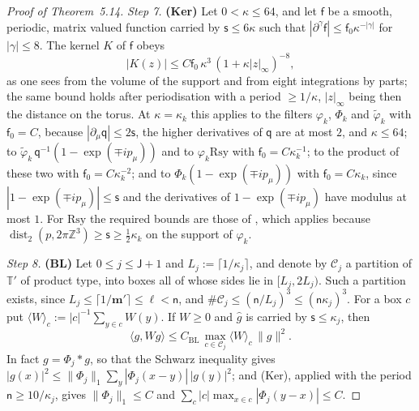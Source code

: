 \documentclass[11pt]{amsart}
\theoremstyle{definition}
\begin{document}
\begin{proof}[Proof of Theorem~5.14]
\emph{Step 7.}
\textbf{(Ker)} Let $0<\kappa\le64$, and let $\mathsf f$ be a smooth, periodic, matrix valued function carried by $\mathsf s\le6\kappa$ such that $|\partial^\gamma\mathsf f|\le\mathsf f_0\kappa^{-|\gamma|}$ for $|\gamma|\le8$.
The kernel $K$ of $\mathsf f$ obeys
\begin{equation*}
|K(z)|\le C\mathsf f_0\,\kappa^3\,(1+\kappa|z|_\infty)^{-8},
\end{equation*}
as one sees from the volume of the support and from eight integrations by parts;
the same bound holds after periodisation with a period $\ge1/\kappa$, $|z|_\infty$ being then the distance on the torus.
At $\kappa=\kappa_k$ this applies to the filters $\varphi_k$, $\Phi_k$ and $\tilde\varphi_k$ with $\mathsf f_0=C$, because $|\partial_\mu\mathsf q|\le2\mathsf s$, the higher derivatives of $\mathsf q$ are at most $2$, and $\kappa\le64$;
to $\tilde\varphi_k\,\mathsf q^{-1}(1-\exp(\mp ip_\mu))$ and to $\varphi_k\mathrm{Rsy}$ with $\mathsf f_0=C\kappa_k^{-1}$;
to the product of these two with $\mathsf f_0=C\kappa_k^{-2}$;
and to $\Phi_k(1-\exp(\mp ip_\mu))$ with $\mathsf f_0=C\kappa_k$, since $|1-\exp(\mp ip_\mu)|\le\mathsf s$ and the derivatives of $1-\exp(\mp ip_\mu)$ have modulus at most $1$.
For $\mathrm{Rsy}$ the required bounds are those of \cite[Proposition~37.1\,(g)]{QEDIII}, which applies because $\operatorname{dist}_2(p,\allowbreak 2\pi\mathbb Z^3)\ge\mathsf s\ge\frac12\kappa_k$ on the support of $\varphi_k$.

\emph{Step 8.}
\textbf{(BL)} Let $0\le j\le\mathsf J+1$ and $L_j:=\lceil1/\kappa_j\rceil$, and denote by $\mathcal C_j$ a partition of $\mathbb T'$ of product type, into boxes all of whose sides lie in $[L_j,2L_j)$.
Such a partition exists, since $L_j\le\lceil1/\mathbf m'\rceil\le\ell<\mathsf n$, and $\#\mathcal C_j\le(\mathsf n/L_j)^3\le(\mathsf n\kappa_j)^3$.
For a box $c$ put $\langle W\rangle_c:=|c|^{-1}\sum_{y\in c}W(y)$.
If $W\ge0$ and $\hat g$ is carried by $\mathsf s\le\kappa_j$, then
\begin{equation*}
\langle g,Wg\rangle\le C_{\mathrm{BL}}\,\max_{c\in\mathcal C_j}\langle W\rangle_c\,\|g\|^2.
\end{equation*}
In fact $g=\Phi_j*g$, so that the Schwarz inequality gives $|g(x)|^2\le\|\Phi_j\|_1\sum_y|\Phi_j(x-y)|\,|g(y)|^2$;
and (Ker), applied with the period $\mathsf n\ge10/\kappa_j$, gives $\|\Phi_j\|_1\le C$ and $\sum_c|c|\max_{x\in c}|\Phi_j(y-x)|\le C$.


\end{proof}
\end{document}
